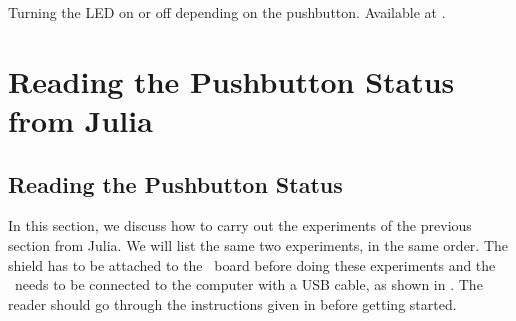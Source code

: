 \begin{pycode}
\label{py:push-100}

\end{pycode}

\begin{pycode}
  {Turning the LED on or off depending on the pushbutton.  Available at
  .}
\label{py:push-200}

\end{pycode}


\section{Reading the Pushbutton Status from Julia}
\subsection{Reading the Pushbutton Status} 
In this section, we discuss how to carry out the experiments of the
previous section from Julia.  We will list the same two experiments,
in the same order.  The shield has to be attached to the \arduino\ board
before doing these experiments and the \arduino\ needs to be connected to the computer 
with a USB cable, as shown in .
The reader should go through the instructions given in  before getting started.

